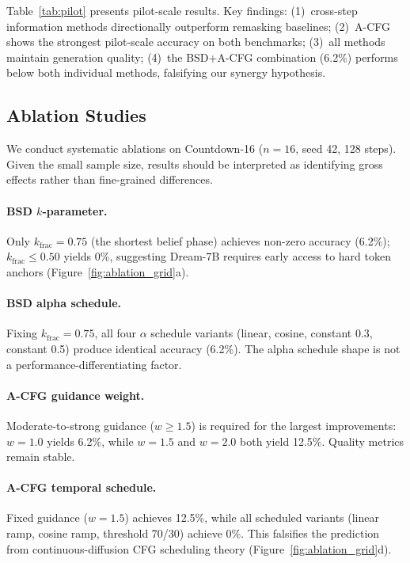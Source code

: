 \documentclass{article}
\begin{document}
Table~\ref{tab:pilot} presents pilot-scale results. Key findings: (1)~cross-step information methods directionally outperform remasking baselines; (2)~A-CFG shows the strongest pilot-scale accuracy on both benchmarks; (3)~all methods maintain generation quality; (4)~the BSD+A-CFG combination (6.2\%) performs below both individual methods, falsifying our synergy hypothesis.

\subsection{Ablation Studies}
\label{sec:ablations}

We conduct systematic ablations on Countdown-16 ($n = 16$, seed 42, 128 steps). Given the small sample size, results should be interpreted as identifying gross effects rather than fine-grained differences.

\paragraph{BSD $k$-parameter.} Only $k_\text{frac} = 0.75$ (the shortest belief phase) achieves non-zero accuracy (6.2\%); $k_\text{frac} \leq 0.50$ yields 0\%, suggesting Dream-7B requires early access to hard token anchors (Figure~\ref{fig:ablation_grid}a).

\paragraph{BSD alpha schedule.} Fixing $k_\text{frac} = 0.75$, all four $\alpha$ schedule variants (linear, cosine, constant 0.3, constant 0.5) produce identical accuracy (6.2\%). The alpha schedule shape is not a performance-differentiating factor.

\paragraph{A-CFG guidance weight.} Moderate-to-strong guidance ($w \geq 1.5$) is required for the largest improvements: $w{=}1.0$ yields 6.2\%, while $w{=}1.5$ and $w{=}2.0$ both yield 12.5\%. Quality metrics remain stable.

\paragraph{A-CFG temporal schedule.} Fixed guidance ($w{=}1.5$) achieves 12.5\%, while all scheduled variants (linear ramp, cosine ramp, threshold 70/30) achieve 0\%. This falsifies the prediction from continuous-diffusion CFG scheduling theory \citep{rojas2025cfgschedule} (Figure~\ref{fig:ablation_grid}d).
\end{document}
